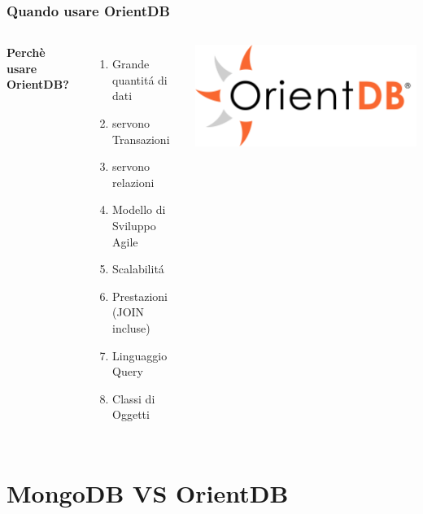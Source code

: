 \documentclass{beamer}
\begin{document}
\begin{frame}
\frametitle{Quando usare OrientDB}
\begin{columns}[c] %

\textbf{Perchè usare OrientDB?}
\begin{enumerate}
\item Grande quantit\'a di dati
\item servono Transazioni
\item servono relazioni
\item Modello di Sviluppo Agile
\item Scalabilit\'a
\item Prestazioni (JOIN incluse)
\item Linguaggio Query
\item Classi di Oggetti
\end{enumerate}

\includegraphics[width=1\linewidth]{orientdb.png}

\end{columns}
\end{frame}

\section{MongoDB VS OrientDB}
\end{document}
